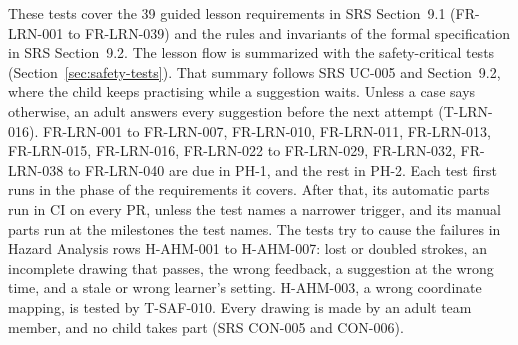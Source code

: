 \documentclass[12pt, titlepage]{article}
\begin{document}
These tests cover the 39 guided lesson requirements in SRS Section~9.1
(FR-LRN-001 to FR-LRN-039) and the rules and invariants of the formal
specification in SRS Section~9.2. The lesson flow is summarized with the
safety-critical tests (Section~\ref{sec:safety-tests}). That summary follows
SRS UC-005 and Section~9.2, where the child keeps practising while a
suggestion waits. Unless a case says otherwise, an adult answers every
suggestion before the next attempt (T-LRN-016). FR-LRN-001 to FR-LRN-007, FR-LRN-010, FR-LRN-011,
FR-LRN-013, FR-LRN-015, FR-LRN-016, FR-LRN-022 to FR-LRN-029, FR-LRN-032,
FR-LRN-038 to FR-LRN-040 are due in PH-1, and the rest in PH-2. Each test first runs in the phase of the
requirements it covers. After that, its automatic parts run in CI on every
PR, unless the test names a narrower trigger, and its manual parts run at
the milestones the test names. The tests try to cause the failures in Hazard
Analysis rows H-AHM-001 to H-AHM-007: lost or doubled strokes, an
incomplete drawing that passes, the wrong feedback, a suggestion at the
wrong time, and a stale or wrong learner's setting. H-AHM-003, a wrong
coordinate mapping, is tested by T-SAF-010. Every drawing is made by an
adult team member, and no child takes part (SRS CON-005 and CON-006).
\end{document}
